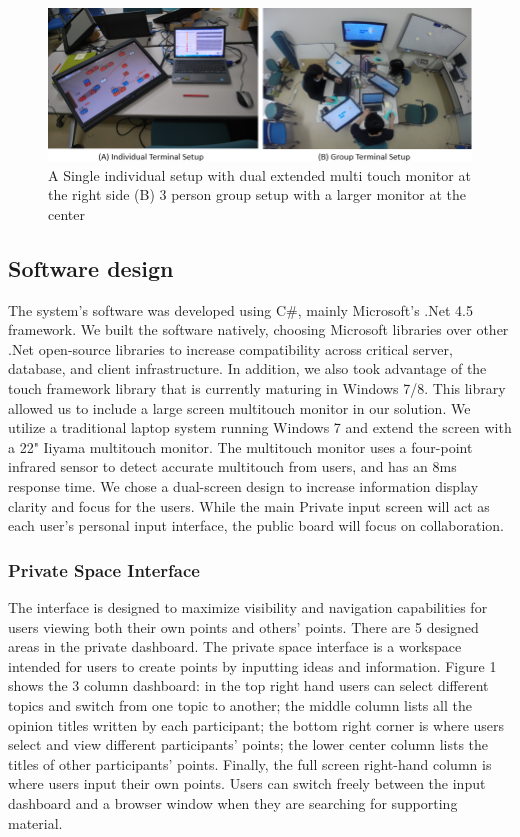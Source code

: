 \documentclass{sigchi}
\begin{document}
\begin{figure}
\centering
\includegraphics[width=1.9\columnwidth]{system}
\caption{{A} Single individual setup with dual extended multi touch monitor at the right side (B) 3 person group setup with a larger monitor at the center}
\label{fig:figure1}
\end{figure}

\subsection{Software design}


The system's software was developed using C\#, mainly Microsoft's .Net 4.5  framework. We built the software natively, choosing Microsoft libraries over other .Net open-source libraries to increase compatibility across critical server, database, and client infrastructure. In addition, we also took advantage of the touch framework library that is currently maturing in Windows 7/8. This library allowed us to include a large screen multitouch monitor in our solution. We utilize a traditional laptop system running Windows 7 and extend the screen with a 22" Iiyama multitouch monitor. The multitouch monitor uses a four-point infrared sensor to detect accurate multitouch from users, and has an 8ms response time. We chose a dual-screen design to increase information display clarity and focus for the users. While the main Private input screen will act as each user's personal input interface,  the public board will focus on collaboration. 


\subsubsection{Private Space Interface}
The interface is designed to maximize visibility and navigation capabilities for users viewing both their own points and others' points. There are 5 designed areas in the private dashboard. The private space interface is a workspace intended for users to create points by inputting ideas and information. Figure 1 shows the 3 column dashboard: in the top right hand users can select different topics and switch from one topic to another; the middle column lists all the opinion titles written by each participant; the bottom right corner is where users select and view different participants' points; the lower center column lists the titles of other participants' points. Finally, the full screen right-hand column is where users input their own points. Users can switch freely between the input dashboard and a browser window when they are searching for supporting material.
\end{document}
